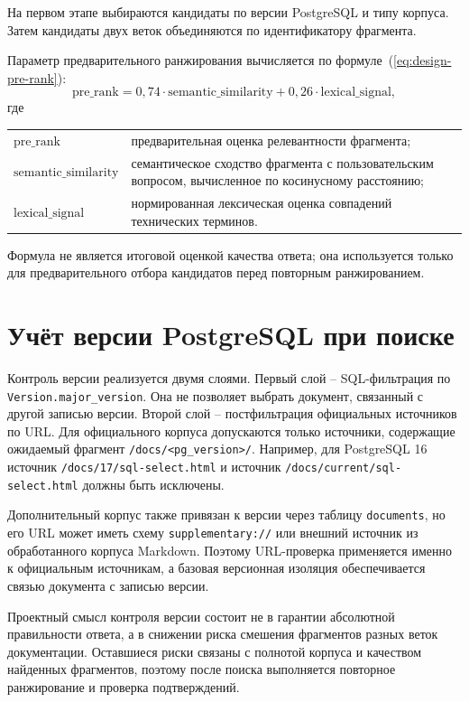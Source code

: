 На первом этапе выбираются кандидаты по версии PostgreSQL и типу корпуса. Затем кандидаты двух веток объединяются по идентификатору фрагмента.

\Needspace{45mm}
Параметр предварительного ранжирования вычисляется по формуле~(\ref{eq:design-pre-rank}):
\begin{equation}
\label{eq:design-pre-rank}
\text{pre\_rank} = 0{,}74 \cdot \text{semantic\_similarity} + 0{,}26 \cdot \text{lexical\_signal},
\end{equation}
\noindent где
\begin{tabular}[t]{@{}l@{ -- }p{}@{}}
$\text{pre\_rank}$ & предварительная оценка релевантности фрагмента;\\
$\text{semantic\_similarity}$ & семантическое сходство фрагмента с пользовательским вопросом, вычисленное по косинусному расстоянию;\\
$\text{lexical\_signal}$ & нормированная лексическая оценка совпадений технических терминов.
\end{tabular}

Формула не является итоговой оценкой качества ответа; она используется только для предварительного отбора кандидатов перед повторным ранжированием.

\section{Учёт версии PostgreSQL при поиске}

Контроль версии реализуется двумя слоями. Первый слой -- SQL-фильтрация по \texttt{Version.major\_version}. Она не позволяет выбрать документ, связанный с другой записью версии. Второй слой -- постфильтрация официальных источников по URL. Для официального корпуса допускаются только источники, содержащие ожидаемый фрагмент \texttt{/docs/<pg\_version>/}. Например, для PostgreSQL 16 источник \texttt{/docs/17/sql-select.html} и источник \texttt{/docs/current/sql-select.html} должны быть исключены.

Дополнительный корпус также привязан к версии через таблицу \texttt{documents}, но его URL может иметь схему \texttt{supplementary://} или внешний источник из обработанного корпуса Markdown. Поэтому URL-проверка применяется именно к официальным источникам, а базовая версионная изоляция обеспечивается связью документа с записью версии.

Проектный смысл контроля версии состоит не в гарантии абсолютной правильности ответа, а в снижении риска смешения фрагментов разных веток документации. Оставшиеся риски связаны с полнотой корпуса и качеством найденных фрагментов, поэтому после поиска выполняется повторное ранжирование и проверка подтверждений.

